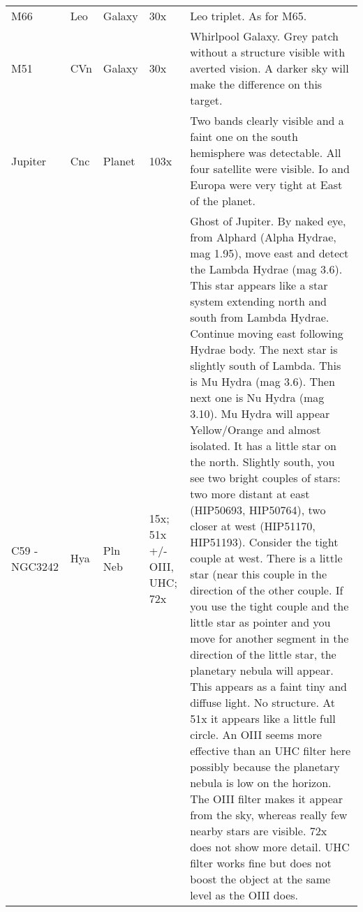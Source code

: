 \begin{longtable}{ p{0.7in}  p{0.3in}  p{0.6in}  p{0.9in}  p{5.8in} }
M66 & Leo & Galaxy & 30x & Leo triplet. As for M65.  \\ 
M51 & CVn & Galaxy & 30x & Whirlpool Galaxy. Grey patch without a structure visible with averted vision. A darker sky will make the difference on this target. \\ 
Jupiter & Cnc & Planet & 103x & Two bands clearly visible and a faint one on the south hemisphere was detectable. All four satellite were visible. Io and Europa were very tight at East of the planet. \\ 
C59 - NGC3242 & Hya & Pln Neb & 15x; 51x +/- OIII, UHC; 72x & Ghost of Jupiter. By naked eye, from Alphard (Alpha Hydrae, mag 1.95), move east and detect the Lambda Hydrae (mag 3.6). This star appears like a star system extending north and south from Lambda Hydrae. Continue moving east following Hydrae body. The next star is slightly south of Lambda. This is Mu Hydra (mag 3.6). Then next one is Nu Hydra (mag 3.10). Mu Hydra will appear Yellow/Orange and almost isolated. It has a little star on the north. Slightly south, you see two bright couples of stars: two more distant at east (HIP50693, HIP50764), two closer at west (HIP51170, HIP51193). Consider the tight couple at west. There is a little star (near this couple in the direction of the other couple. If you use the tight couple and the little star as pointer and you move for another segment in the direction of the little star, the planetary nebula will appear. This appears as a faint tiny and diffuse light. No structure. At 51x it appears like a little full circle. An OIII seems more effective than an UHC filter here possibly because the planetary nebula is low on the horizon. The OIII filter makes it appear from the sky, whereas really few nearby stars are visible. 72x does not show more detail. UHC filter works fine but does not boost the object at the same level as the OIII does. \\ 
\hline 
\end{longtable} 
